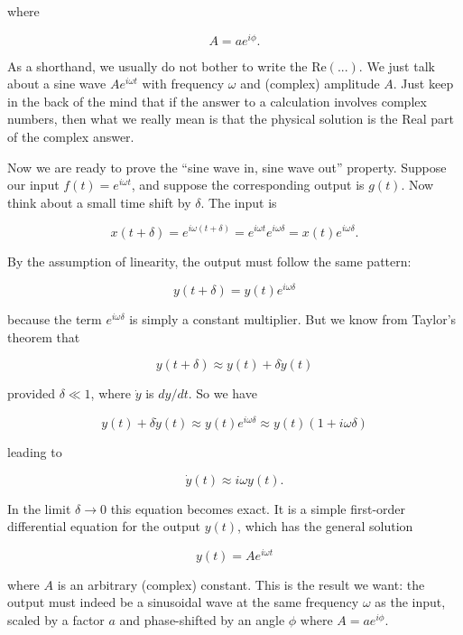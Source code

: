   \noindent{}where 

  \begin{equation*}A=ae^{i\phi}. \tag{3}\end{equation*} 

  As a shorthand, we usually do not bother to write the $\mathrm{Re}(...)$. We 
  just talk about a sine wave $Ae^{i \omega t}$ with frequency $\omega$ and 
  (complex) amplitude $A$. Just keep in the back of the mind that if the answer 
  to a calculation involves complex numbers, then what we really mean is that 
  the physical solution is the Real part of the complex answer. 

  Now we are ready to prove the ``sine wave in, sine wave out'' property. 
  Suppose our input $f(t)=e^{i \omega t}$, and suppose the corresponding output 
  is $g(t)$. Now think about a small time shift by $\delta$. The input is 

  \begin{equation*}x(t+\delta)=e^{i \omega (t+\delta)} = e^{i \omega t} e^{i 
  \omega \delta} = x(t) e^{i \omega \delta}. \tag{4}\end{equation*} 

  By the assumption of linearity, the output must follow the same pattern: 

  \begin{equation*}y(t+\delta)=y(t) e^{i \omega \delta} \tag{5}\end{equation*} 

  \noindent{}because the term $e^{i \omega \delta}$ is simply a constant 
  multiplier. But we know from Taylor's theorem that 

  \begin{equation*}y(t+\delta) \approx y(t) + \delta \dot{y}(t) 
  \tag{6}\end{equation*} 

  \noindent{}provided $\delta \ll 1$, where $\dot{y}$ is $dy/dt$. So we have 

  \begin{equation*}y(t) + \delta \dot{y}(t) \approx y(t) e^{i \omega \delta} 
  \approx y(t) (1 + i \omega \delta) \tag{7}\end{equation*} 

  \noindent{}leading to 

  \begin{equation*}\dot{y}(t) \approx i \omega y(t). \tag{8}\end{equation*} 

  In the limit $\delta \rightarrow 0$ this equation becomes exact. It is a 
  simple first-order differential equation for the output $y(t)$, which has the 
  general solution 

  \begin{equation*}y(t) = A e^{i \omega t} \tag{9}\end{equation*} 

  \noindent{}where $A$ is an arbitrary (complex) constant. This is the result 
  we want: the output must indeed be a sinusoidal wave at the same frequency 
  $\omega$ as the input, scaled by a factor $a$ and phase-shifted by an angle 
  $\phi$ where $A=a e^{i \phi}$. 